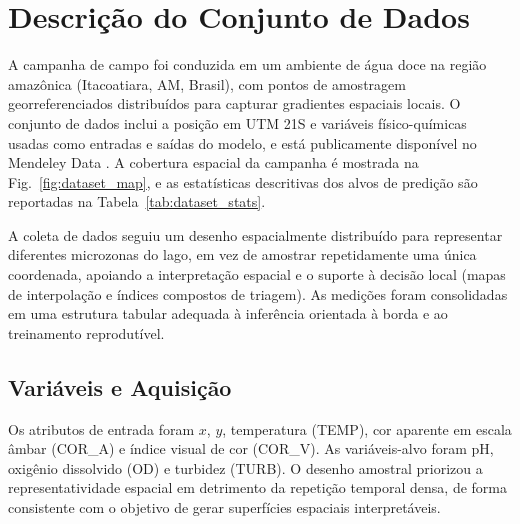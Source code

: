 \section{Descrição do Conjunto de Dados}

A campanha de campo foi conduzida em um ambiente de água doce na região amazônica (Itacoatiara, AM, Brasil), com pontos de amostragem georreferenciados distribuídos para capturar gradientes espaciais locais. O conjunto de dados inclui a posição em UTM 21S e variáveis físico-químicas usadas como entradas e saídas do modelo, e está publicamente disponível no Mendeley Data \cite{assuncao2026dataset}. A cobertura espacial da campanha é mostrada na Fig.~\ref{fig:dataset_map}, e as estatísticas descritivas dos alvos de predição são reportadas na Tabela~\ref{tab:dataset_stats}.

A coleta de dados seguiu um desenho espacialmente distribuído para representar diferentes microzonas do lago, em vez de amostrar repetidamente uma única coordenada, apoiando a interpretação espacial e o suporte à decisão local (mapas de interpolação e índices compostos de triagem). As medições foram consolidadas em uma estrutura tabular adequada à inferência orientada à borda e ao treinamento reprodutível.

\subsection{Variáveis e Aquisição}
Os atributos de entrada foram $x$, $y$, temperatura (TEMP), cor aparente em escala âmbar (COR\_A) e índice visual de cor (COR\_V). As variáveis-alvo foram pH, oxigênio dissolvido (OD) e turbidez (TURB).  O desenho amostral priorizou a representatividade espacial em detrimento da repetição temporal densa, de forma consistente com o objetivo de gerar superfícies espaciais interpretáveis.


